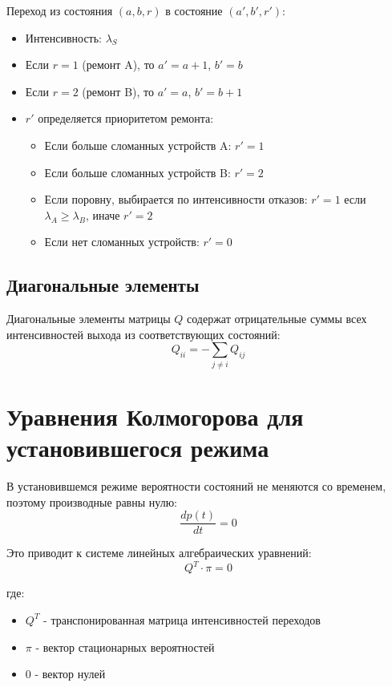 Переход из состояния $(a, b, r)$ в состояние $(a', b', r')$:
\begin{itemize}
    \item Интенсивность: $\lambda_S$
    \item Если $r = 1$ (ремонт A), то $a' = a+1$, $b' = b$
    \item Если $r = 2$ (ремонт B), то $a' = a$, $b' = b+1$
    \item $r'$ определяется приоритетом ремонта:
    \begin{itemize}
        \item Если больше сломанных устройств A: $r' = 1$
        \item Если больше сломанных устройств B: $r' = 2$
        \item Если поровну, выбирается по интенсивности отказов: $r' = 1$ если $\lambda_A \geq \lambda_B$, иначе $r' = 2$
        \item Если нет сломанных устройств: $r' = 0$
    \end{itemize}
\end{itemize}

\subsection{Диагональные элементы}

Диагональные элементы матрицы $Q$ содержат отрицательные суммы всех интенсивностей выхода из соответствующих состояний:
\begin{equation}
    Q_{ii} = -\sum_{j \neq i} Q_{ij}
\end{equation}

\section{Уравнения Колмогорова для установившегося режима}

В установившемся режиме вероятности состояний не меняются со временем, поэтому производные равны нулю:
\begin{equation}
    \frac{dp(t)}{dt} = 0
\end{equation}

Это приводит к системе линейных алгебраических уравнений:
\begin{equation}
    Q^T \cdot \pi = 0
\end{equation}

где:
\begin{itemize}
    \item $Q^T$ - транспонированная матрица интенсивностей переходов
    \item $\pi$ - вектор стационарных вероятностей
    \item $0$ - вектор нулей
\end{itemize}

